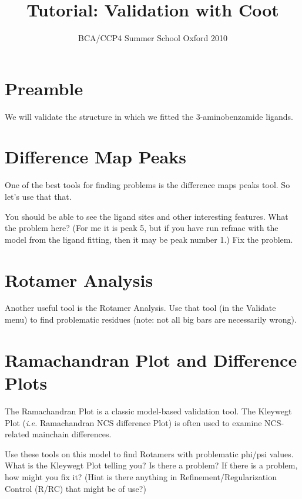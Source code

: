 \documentclass{article}
\title{Tutorial: Validation with Coot}
\author{BCA/CCP4 Summer School Oxford 2010}
\begin{document}
\maketitle

\section{Preamble}

  We will validate the structure in which we fitted the
  3-aminobenzamide ligands.

\section{Difference Map Peaks}

  One of the best tools for finding problems is the difference maps
  peaks tool. So let's use that that.  

  You should be able to see the ligand sites and other interesting
  features. What the problem here? (For me it is peak 5, but if you
  have run refmac with the model from the ligand fitting, then it may
  be peak number 1.)  Fix the problem.

\section{Rotamer Analysis}
 
Another useful tool is the Rotamer Analysis.  Use that tool (in the
\textsf{Validate} menu) to find problematic residues (note: not all
big bars are necessarily wrong).





\section{Ramachandran Plot and Difference Plots}

The Ramachandran Plot is a classic model-based validation tool.  The
Kleywegt Plot (\emph{i.e.} Ramachandran NCS difference Plot) is often
used to examine NCS-related mainchain differences.

Use these tools on this model to find Rotamers with problematic
phi/psi values.  What is the Kleywegt Plot telling you? Is there a
problem? If there is a problem, how might you fix it? (Hint is there
anything in Refinement/Regularization Control (R/RC) that might be of
use?)
\end{document}
